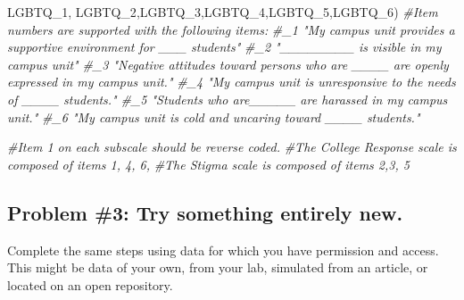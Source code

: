 \documentclass[
  english,
]{book}
\newenvironment{Shaded}{\begin{snugshade}}{\end{snugshade}}
\newcommand{\CommentTok}[1]{\textcolor[rgb]{0.56,0.35,0.01}{\textit{#1}}}
\newcommand{\NormalTok}[1]{#1}
\newcommand{\StringTok}[1]{\textcolor[rgb]{0.31,0.60,0.02}{#1}}
\begin{document}
\begin{Shaded}
\begin{Highlighting}[]
         \StringTok{\textquotesingle{}LGBTQ\_1\textquotesingle{}}\NormalTok{, }\StringTok{\textquotesingle{}LGBTQ\_2\textquotesingle{}}\NormalTok{,}\StringTok{\textquotesingle{}LGBTQ\_3\textquotesingle{}}\NormalTok{,}\StringTok{\textquotesingle{}LGBTQ\_4\textquotesingle{}}\NormalTok{,}\StringTok{\textquotesingle{}LGBTQ\_5\textquotesingle{}}\NormalTok{,}\StringTok{\textquotesingle{}LGBTQ\_6\textquotesingle{}}\NormalTok{)}
\CommentTok{\#Item numbers are supported with the following items:}
\CommentTok{\#\_1 "My campus unit provides a supportive environment for \_\_\_ students"}
\CommentTok{\#\_2 "\_\_\_\_\_\_\_\_ is visible in my campus unit"}
\CommentTok{\#\_3 "Negative attitudes toward persons who are \_\_\_\_ are openly expressed in my campus unit."}
\CommentTok{\#\_4 "My campus unit is unresponsive to the needs of \_\_\_\_ students."}
\CommentTok{\#\_5 "Students who are\_\_\_\_\_ are harassed in my campus unit."}
\CommentTok{\#\_6 "My campus unit is cold and uncaring toward \_\_\_\_ students."}

\CommentTok{\#Item 1 on each subscale should be reverse coded.}
\CommentTok{\#The College Response scale is composed of items 1, 4, 6, }
\CommentTok{\#The Stigma scale is composed of items 2,3, 5}
\end{Highlighting}
\end{Shaded}

\hypertarget{problem-3-try-something-entirely-new.-1}{%
\subsection{Problem \#3: Try something entirely new.}\label{problem-3-try-something-entirely-new.-1}}

Complete the same steps using data for which you have permission and access. This might be data of your own, from your lab, simulated from an article, or located on an open repository.
\end{document}
